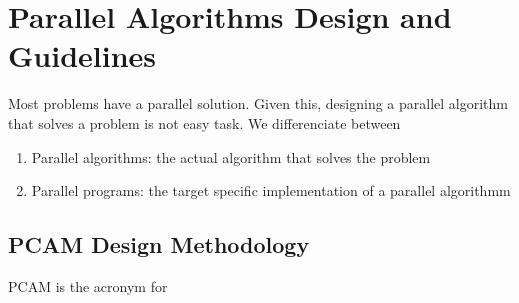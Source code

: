 \documentclass{article}
\begin{document}
	\section{Parallel Algorithms Design and Guidelines}
		Most problems have a parallel solution. Given this, designing a parallel algorithm that solves a problem is not easy task. We differenciate between
		\begin{enumerate}
			\item Parallel algorithms: the actual algorithm that solves the problem
	 		\item Parallel programs: the target specific implementation of a parallel algorithmm
		\end{enumerate}

		\subsection{PCAM Design Methodology}
			PCAM is the acronym for
\end{document}
